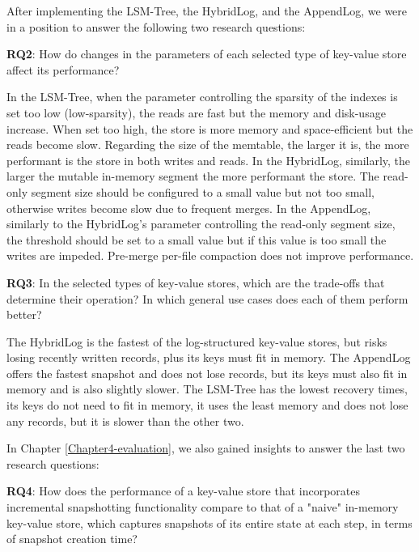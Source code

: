 After implementing the LSM-Tree, the HybridLog, and the AppendLog, we were in a position to answer the following two research questions:

\begin{tcolorbox}
    \textbf{RQ2}: How do changes in the parameters of each selected type of key-value store affect its performance?
\end{tcolorbox}

In the LSM-Tree, when the parameter controlling the sparsity of the indexes is set too low (low-sparsity), the reads are fast but the memory and disk-usage increase. When set too high, the store is more memory and space-efficient but the reads become slow.
Regarding the size of the memtable, the larger it is, the more performant is the store in both writes and reads. In the HybridLog, similarly, the larger the mutable in-memory segment the more performant the store. The read-only segment size should be configured to a small value but not too small, otherwise writes become slow due to frequent merges.
In the AppendLog, similarly to the HybridLog's parameter controlling the read-only segment size, the threshold should be set to a small value but if this value is too small the writes are impeded. Pre-merge per-file compaction does not improve performance.

\begin{tcolorbox}
    \textbf{RQ3}: In the selected types of key-value stores, which are the trade-offs that determine their operation? In which general use cases does each of them perform better?
\end{tcolorbox}

The HybridLog is the fastest of the log-structured key-value stores, but risks losing recently written records, plus its keys must fit in memory. The AppendLog offers the fastest snapshot and does not lose records, but its keys must also fit in memory and is also slightly slower. The LSM-Tree has the lowest recovery times, its keys do not need to fit in memory, it uses the least memory and does not lose any records, but it is slower than the other two.

In Chapter \ref{Chapter4-evaluation}, we also gained insights to answer the last two research questions:

\begin{tcolorbox}
    \textbf{RQ4}: How does the performance of a key-value store that incorporates incremental snapshotting functionality compare to that of a "naive" in-memory key-value store, which captures snapshots of its entire state at each step, in terms of snapshot creation time?
\end{tcolorbox}

